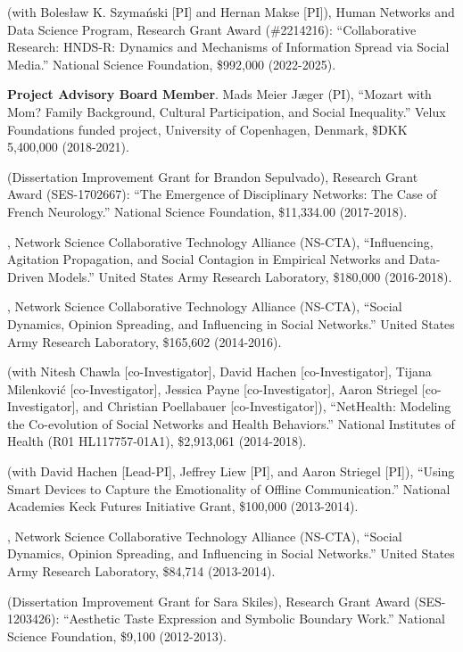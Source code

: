
 (with Boles\l{}aw K. Szyma\'{n}ski [PI] and Hernan Makse [PI]), Human Networks and Data Science Program, Research Grant Award (\#2214216): ``Collaborative Research: HNDS-R: Dynamics and Mechanisms of Information Spread via Social Media.'' National Science Foundation, \$992,000 (2022-2025).

\ind\textbf{Project Advisory Board Member}. Mads Meier Jæger (PI), ``Mozart with Mom? Family Background, Cultural Participation, and Social Inequality.'' Velux Foundations funded project, University of Copenhagen, Denmark, \$DKK 5,400,000 (2018-2021).

 (Dissertation Improvement Grant for Brandon Sepulvado), Research Grant Award (SES-1702667): ``The Emergence of Disciplinary Networks: The Case of French Neurology.'' National Science Foundation, \$11,334.00 (2017-2018).

, Network Science Collaborative Technology Alliance (NS-CTA), ``Influencing, Agitation Propagation, and Social Contagion in Empirical Networks and Data-Driven Models.'' United States Army Research Laboratory, \$180,000 (2016-2018).

, Network Science Collaborative Technology Alliance (NS-CTA), ``Social Dynamics, Opinion Spreading, and Influencing in Social Networks.'' United States Army Research Laboratory, \$165,602 (2014-2016).

 (with Nitesh Chawla [co-Investigator], David Hachen [co-Investigator], Tijana Milenkovi\'{c} [co-Investigator], Jessica Payne [co-Investigator], Aaron Striegel [co-Investigator], and Christian Poellabauer [co-Investigator]), ``NetHealth: Modeling the Co-evolution of Social Networks and Health Behaviors.'' National Institutes of Health (R01 HL117757-01A1), \$2,913,061 (2014-2018).
 
 (with  David Hachen [Lead-PI], Jeffrey Liew [PI], and Aaron Striegel [PI]), ``Using Smart Devices to Capture the Emotionality of Offline Communication.'' National Academies Keck Futures Initiative Grant, \$100,000 (2013-2014).

, Network Science Collaborative Technology Alliance (NS-CTA), ``Social Dynamics, Opinion Spreading, and Influencing in Social Networks.'' United States Army Research Laboratory, \$84,714 (2013-2014).

 (Dissertation Improvement Grant for Sara Skiles), Research Grant Award (SES-1203426): ``Aesthetic Taste Expression and Symbolic Boundary Work.''  National Science Foundation, \$9,100 (2012-2013).

